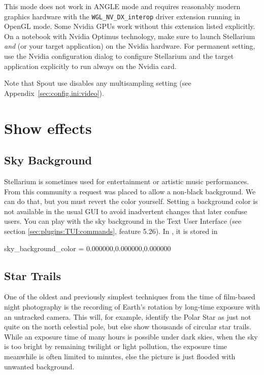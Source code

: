 This mode does not work in ANGLE mode and requires reasonably modern graphics hardware with the \texttt{WGL\_NV\_DX\_interop} 
driver extension running in OpenGL mode. Some Nvidia GPUs work without this extension listed explicitly. 
On a notebook with Nvidia Optimus technology, make sure to launch Stellarium \emph{and}  
(or your target application) on the Nvidia hardware. 
For permanent setting, use the Nvidia configuration dialog to configure Stellarium and the target application explicitly to run always on the Nvidia card.

Note that Spout use disables any multisampling setting (see Appendix~\ref{sec:config.ini:video}). 


\section{Show effects} 
\label{sec:CommandLineOptions:Special:Show}

\subsection{Sky Background}
\label{sec:CommandLineOptions:Special:ColoredBackground}

Stellarium is sometimes used for entertainment or artistic music performances. 
From this community a request was placed to allow a non-black background. We can do that, but you must revert the color yourself.
Setting a background color is not available in the usual GUI to avoid inadvertent changes that later confuse users. 
You can play with the sky background in the Text User Interface (see section \ref{sec:plugins:TUI:commands}, feature 5.26). 
In , it is stored in

\begin{configfile}
[color]
sky_background_color  = 0.000000,0.000000,0.000000
\end{configfile}

\subsection{Star Trails}
\label{sec:CommandLineOptions:Special:StarTrails}

One of the oldest  and previously simplest techniques from the time of film-based night photography is the recording 
of Earth's rotation by long-time exposure with an untracked camera. 
This will, for example, identify the Polar Star as just not quite on the north celestial pole, but else show thousands of circular star trails. 
While an exposure time of many hours is possible under dark skies, when the sky is too bright by remaining twilight or light pollution, 
the exposure time meanwhile is often limited to minutes, else the picture is just flooded with unwanted background. 

